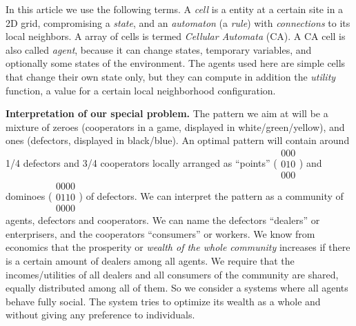 \documentclass[10pt,a4paper]{article}  %
\begin{document}
In this article we use the following terms. 
A \textit{cell} is a entity at a certain site in a 2D grid,
compromising a \textit{state}, and an \textit{automaton} (a \textit{rule}) with \textit{connections} 
to its local neighbors. 
A array of cells is termed \textit{Cellular Automata} (CA).
A CA cell is also called \textit{agent}, because it can change states, 
temporary variables, and
 optionally some states of the environment. 
The agents used here are simple cells that change their own state only,
but they can compute in addition the   \textit{utility} function, 
a  value for a certain local neighborhood configuration. 


\textbf{Interpretation of our special problem.}
The pattern we aim at will be a mixture of 
zeroes (cooperators in a game, displayed in white/green/yellow),  
and ones (defectors, displayed in black/blue).
An optimal pattern will contain around 1/4 defectors and 3/4 cooperators
locally arranged as ``points''
($\substack{000
          \\010
          \\000}$)   
and dominoes 
($\substack{0000
          \\0110
          \\0000}$)  
of defectors.
We can interpret the pattern as a community of agents,
defectors and cooperators. 
We can name the defectors ``dealers'' or enterprisers, and the 
cooperators ``consumers'' or workers.
We know from economics that the prosperity or 
\textit{wealth of the whole community} 
increases if there is a certain amount of dealers among all agents. 
We require that the incomes/utilities of all dealers and all consumers
of the community are shared, equally distributed among all of them. 
So we consider a systems where all agents behave fully social. 
The system tries to optimize its wealth as a whole and without giving any
preference to individuals.
\end{document}
